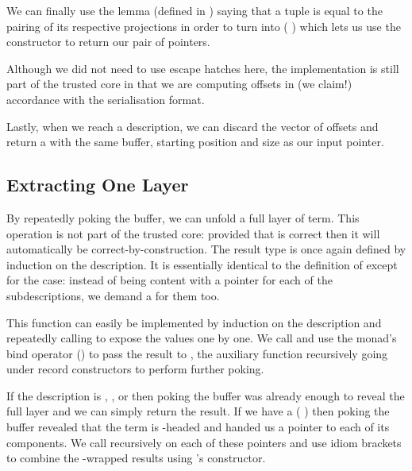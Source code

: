 We can finally use the lemma 
(defined in ) saying that a tuple
is equal to the pairing of its respective projections
in order to turn  into
(  \IdrisData{\#}  )
which lets us use the  constructor \IdrisData{(\#)} to return our
pair of pointers.

Although we did not need to use escape hatches here, the implementation
is still part of the trusted core in that we are computing offsets in
(we claim!) accordance with the serialisation format.


Lastly, when we reach a  description, we can discard the
vector of offsets and return a  with the same buffer,
starting position and size as our input pointer.

\subsection{Extracting One Layer}

By repeatedly poking the buffer, we can unfold a full layer of term.
This operation is not part of the trusted core: provided that
 is correct then it will automatically be
correct-by-construction.
The result type is once again defined by induction on the description.
It is essentially identical to the definition of
 except for the  case:
instead of being content with a pointer for each of the
subdescriptions, we demand a  for them too.


This function can easily be implemented by induction on the description
and repeatedly calling  to expose the values one by
one.
%
We call  and use the  monad's bind
operator (\IdrisFunction{>>=}) to pass the result to ,
the auxiliary function recursively going under record constructors to
perform further poking.


If the description is , , or
 then poking the buffer was already enough to
reveal the full layer and we can simply return the result.
%
If we have a (  )
then poking the buffer revealed that the term is \IdrisData{(\#)}-headed
and handed us a pointer to each of its components.
%
We call  recursively on each of these pointers and
use idiom brackets to combine the -wrapped results
using 's \IdrisData{(\#)} constructor.

